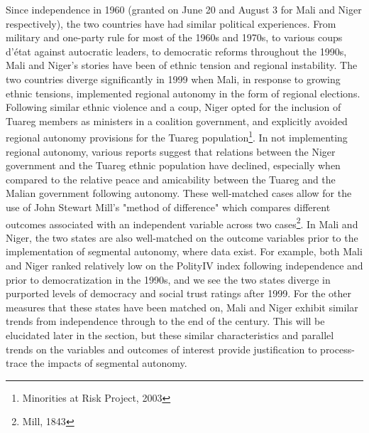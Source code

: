 \documentclass[12pt]{article}
\begin{document}
Since independence in 1960 (granted on  June 20 and August 3 for Mali and Niger respectively), the two countries have had similar political experiences. From military and one-party rule for most of the 1960s and 1970s, to various coups d’état against autocratic leaders, to democratic reforms throughout the 1990s, Mali and Niger's stories have been of ethnic tension and regional instability. The two countries diverge significantly in 1999 when Mali, in response to growing ethnic tensions, implemented regional autonomy in the form of regional elections. Following similar ethnic violence and a coup, Niger opted for the inclusion of Tuareg members as ministers in a coalition government, and explicitly avoided regional autonomy provisions for the Tuareg population\footnote{Minorities at Risk Project, 2003}. In not implementing regional autonomy, various reports suggest that relations between the Niger government and the Tuareg ethnic population have declined, especially when compared to the relative peace and amicability between the Tuareg and the Malian government following autonomy. These well-matched cases allow for the use of John Stewart Mill's "method of difference" which compares different outcomes associated with an independent variable across two cases\footnote{Mill, 1843}. In Mali and Niger, the two states are also well-matched on the outcome variables prior to the implementation of segmental autonomy, where data exist. For example, both Mali and Niger ranked relatively low on the PolityIV index following independence and prior to democratization in the 1990s, and we see the two states diverge in purported levels of democracy and social trust ratings after 1999. For the other measures that these states have been matched on, Mali and Niger exhibit similar trends from independence through to the end of the century. This will be elucidated later in the section, but these similar characteristics and parallel trends on the variables and outcomes of interest provide justification to process-trace the impacts of segmental autonomy. 
\end{document}
